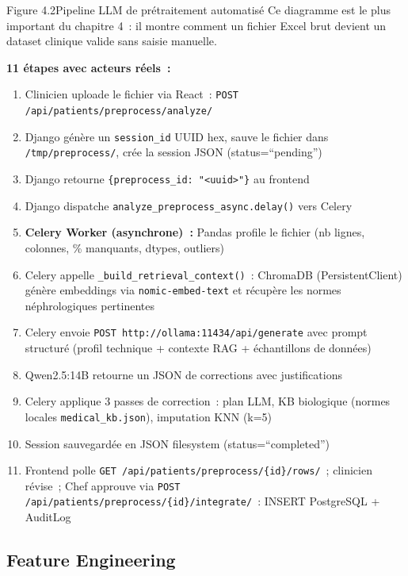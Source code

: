 \documentclass[12pt,a4paper]{article}
\begin{document}
\begin{figbox}{Figure 4.2}{Pipeline LLM de prétraitement automatisé}
Ce diagramme est le plus important du chapitre 4~: il montre comment un fichier
Excel brut devient un dataset clinique valide sans saisie manuelle.

\textbf{11 étapes avec acteurs réels~:}
\begin{enumerate}[leftmargin=2em, itemsep=2pt]
  \item Clinicien uploade le fichier via React~: \texttt{POST /api/patients/preprocess/analyze/}
  \item Django génère un \texttt{session\_id} UUID hex, sauve le fichier dans
    \texttt{/tmp/preprocess/}, crée la session JSON (status=``pending'')
  \item Django retourne \texttt{\{preprocess\_id: "<uuid>"\}} au frontend
  \item Django dispatche \texttt{analyze\_preprocess\_async.delay()} vers Celery
  \item \textbf{Celery Worker (asynchrone)~:} Pandas profile le fichier
    (nb lignes, colonnes, \% manquants, dtypes, outliers)
  \item Celery appelle \texttt{\_build\_retrieval\_context()}~: ChromaDB
    (PersistentClient) génère embeddings via \texttt{nomic-embed-text} et
    récupère les normes néphrologiques pertinentes
  \item Celery envoie \texttt{POST http://ollama:11434/api/generate} avec
    prompt structuré (profil technique + contexte RAG + échantillons de données)
  \item Qwen2.5:14B retourne un JSON de corrections avec justifications
  \item Celery applique 3 passes de correction~: plan LLM, KB biologique
    (normes locales \texttt{medical\_kb.json}), imputation KNN (k=5)
  \item Session sauvegardée en JSON filesystem (status=``completed'')
  \item Frontend polle \texttt{GET /api/patients/preprocess/\{id\}/rows/}~;
    clinicien révise~; Chef approuve via
    \texttt{POST /api/patients/preprocess/\{id\}/integrate/}~: INSERT PostgreSQL + AuditLog
\end{enumerate}
\end{figbox}

\subsection{Feature Engineering}
\end{document}
